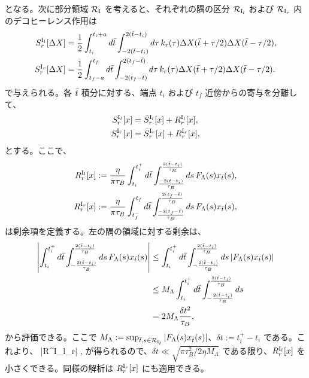 \ee
となる。次に部分領域 $\mathcal{R}_{\rm I}$ を考えると、それぞれの隅の区分 $\mathcal{R}_{{\rm I}_l}$ および $\mathcal{R}_{{\rm I}_r}$ 内のデコヒーレンス作用は
\begin{subequations}
\begin{align}
    S^{{\rm I}_l}_r[\Delta X] &= \frac{1}{2}\int^{t_i+a}_{t_i}d\bar{t}\int^{2(\bar{t}-t_i)}_{-2(\bar{t}-t_i)}d\tau\,k_r(\tau)\Delta X(\bar{t}+\tau/2)\Delta X(\bar{t}-\tau/2), \label{eq:decoh_action_l} \\
    S^{{\rm I}_r}_r[\Delta X] &= \frac{1}{2}\int^{t_f}_{t_f-a}d\bar{t}\int^{2(t_f-\bar{t})}_{-2(t_f-\bar{t})}d\tau\,k_r(\tau)\Delta X(\bar{t}+\tau/2)\Delta X(\bar{t}-\tau/2). \label{eq:decoh_action_r}
\end{align}
\end{subequations}
で与えられる。各 $\bar{t}$ 積分に対する、端点 $t_i$ および $t_f$ 近傍からの寄与を分離して、
\begin{subequations}
\begin{align}
    S^{{\rm I}_l}_r[x] &= \bar{S}^{{\rm I}_l}_r[x] + R^{{\rm I}_l}_r[x], \\
    S^{{\rm I}_r}_r[x] &= \bar{S}^{{\rm I}_r}_r[x] + R^{{\rm I}_r}_r[x],
\end{align}
\end{subequations}
とする。ここで、
\begin{subequations}
\begin{align}
    R^{{\rm I}_l}_r[x] &:= \frac{\eta}{\pi\tau_B}\int^{t^+_i}_{t_i}d\bar{t}\int^{\frac{2(\bar{t} - t_i)}{\tau_B}}_{\frac{-2(\bar{t} - t_i)}{\tau_B}}ds\,F_{\Lambda}(s)x_{\bar{t}}(s), \label{eq:R_left}\\
    R^{{\rm I}_r}_r[x] &:= \frac{\eta}{\pi\tau_B}\int^{t_f}_{t^-_f}d\bar{t}\int^{\frac{2(t_f - \bar{t})}{\tau_B}}_{\frac{-2(t_f - \bar{t})}{\tau_B}}ds\,F_{\Lambda}(s)x_{\bar{t}}(s),\label{eq:R_right}
\end{align}
\end{subequations}
は剰余項を定義する。左の隅の領域に対する剰余は、
\begin{align}
    \left|\int^{t^+_i}_{t_i} d\bar{t}\int^{\frac{2(\bar{t} - t_i)}{\tau_B}}_{-\frac{2(\bar{t} - t_i)}{\tau_B}} ds\,F_{\Lambda}(s)x_{\bar{t}}(s)\right| &\leq \int^{t^+_i}_{t_i} d\bar{t}\int^{\frac{2(\bar{t} - t_i)}{\tau_B}}_{-\frac{2(\bar{t} - t_i)}{\tau_B}} ds\,|F_{\Lambda}(s)x_{\bar{t}}(s)| \nonumber\\
    &\leq M_{\Lambda}\int^{t^+_i}_{t_i} d\bar{t}\int^{\frac{2(\bar{t} - t_i)}{\tau_B}}_{-\frac{2(\bar{t} - t_i)}{\tau_B}}ds \nonumber\\
    &= 2M_{\Lambda}\frac{\delta t^2}{\tau_B},
\end{align}
から評価できる。ここで $M_{\Lambda} := \sup_{\bar{t},s\in\mathcal{R}_{{\rm I}_l}}|F_{\Lambda}(s)x_{\bar{t}}(s)|$、$\delta t := t^+_i-t_i$ である。これより、
\be
    |R^{{\rm I}_l}_r| \leq {},
\ee
が得られるので、$\delta t \ll \sqrt{\pi\tau^2_B/2\eta M_{\Lambda}}$ である限り、$R^{{\rm I}_l}_r[x]$ を小さくできる。同様の解析は $R^{{\rm I}_r}_r[x]$ にも適用できる。

